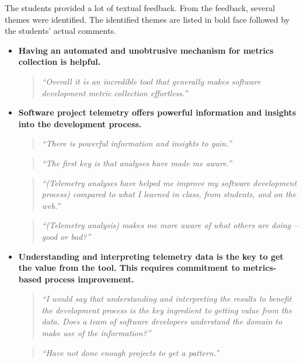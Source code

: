 The students provided a lot of textual feedback. From the feedback, several themes were identified. The identified themes are listed in bold face followed by the students' actual comments.

\begin{itemize}
	\item \textbf{Having an automated and unobtrusive mechanism for
	              metrics collection is helpful.}
    \begin{quote} \textit{``Overall it is an incredible tool that generally makes 
           software development metric collection effortless.''}\end{quote}


  \item \textbf{Software project telemetry offers powerful information 
                and insights into the development process.}
    \begin{quote} \textit{``There is powerful information and insights 
           to gain.''} \end{quote} 
    \begin{quote} \textit{``The first key is that analyses have made 
           me aware.''} \end{quote}
    \begin{quote} \textit{``(Telemetry analyses have helped me improve 
           my software development process) compared to what I learned 
           in class, from students, and on the web.''} \end{quote}
    \begin{quote} \textit{``(Telemetry analysis) makes me more aware of 
           what others are doing -- good or bad?''} \end{quote}
    

  \item \textbf{Understanding and interpreting telemetry data is the key to 
                get the value from the tool. This requires commitment 
                to metrics-based process improvement.}
    \begin{quote} \textit{``I would say that understanding and interpreting 
           the results to benefit the development process is the key ingredient 
           to getting value from the data. Does a team of software developers 
           understand the domain to make use of the information?''} \end{quote}
    \begin{quote} \textit{``Have not done enough projects to get a
           pattern.''} \end{quote}
              

\end{itemize}
